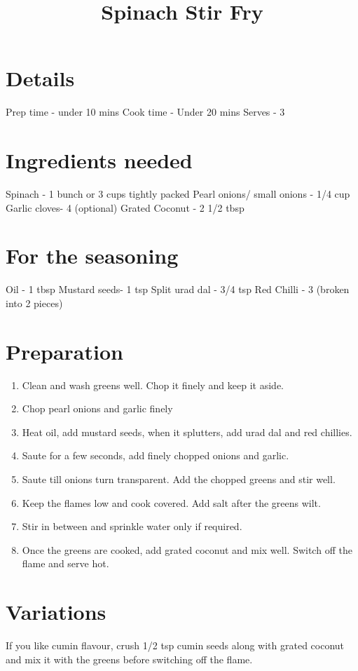 \documentclass[12pt,a4paper]{article}
\title{Spinach Stir Fry}
\author{}
\date{}
\begin{document}
\maketitle

\section*{Details}
Prep time - under 10 mins
Cook time - Under 20 mins
Serves - 3

\section*{Ingredients needed}
Spinach - 1 bunch or 3 cups tightly packed 
Pearl onions/ small onions - 1/4 cup
Garlic cloves- 4 (optional)
Grated Coconut - 2 1/2 tbsp

\section*{For the seasoning}
Oil - 1 tbsp
Mustard seeds- 1 tsp
Split urad dal - 3/4 tsp
Red Chilli - 3 (broken into 2 pieces)

\section*{Preparation}
\begin{enumerate}

\item Clean and wash greens well. Chop it finely and keep it aside.

\item Chop pearl onions and garlic finely 
\item
Heat oil, add mustard seeds, when it splutters, add urad dal and red chillies.
\item
Saute for a few seconds, add finely chopped onions and garlic.
\item
Saute till onions turn transparent. Add the chopped greens and stir well.
\item
Keep the flames low and cook covered. Add salt after the greens wilt.
\item
Stir in between and sprinkle water only if required.
\item
Once the greens are cooked, add grated coconut and mix well. Switch off the flame and serve hot.
\end{enumerate}
\section*{Variations}

If you like cumin flavour, crush 1/2 tsp cumin seeds along with grated coconut and mix it with the greens before switching off the flame.
\end{document}
